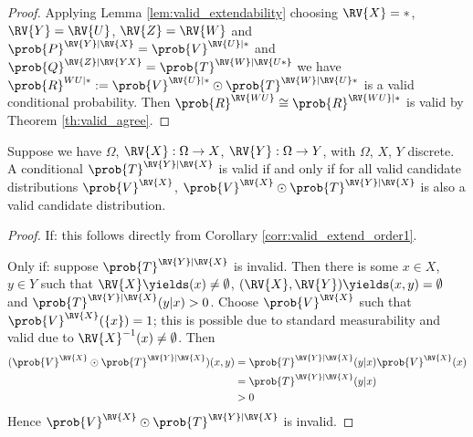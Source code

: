\begin{proof}
Applying Lemma \ref{lem:valid_extendability} choosing $\RV{X}=*$, $\RV{Y}=\RV{U}$, $\RV{Z}=\RV{W}$ and $\prob{P}^{\RV{Y}|\RV{X}}=\prob{V}^{\RV{U}|*}$ and $\prob{Q}^{\RV{Z}|\RV{YX}}=\prob{T}^{\RV{W}|\RV{U*}}$ we have $\prob{R}^{WU|*}:=\prob{V}^{\RV{U}|*}\odot \prob{T}^{\RV{W}|\RV{U}*}$ is a valid conditional probability. Then $\prob{R}^{\RV{WU}}\cong \prob{R}^{\RV{WU}|*}$ is valid by Theorem \ref{th:valid_agree}.
\end{proof}

\begin{theorem}\label{th:valid_conditional_probability}
Suppose we have $\Omega$, $\RV{X}:\Omega\to X$, $\RV{Y}:\Omega\to Y$, with $\Omega$, $X$, $Y$ discrete. A conditional $\prob{T}^{\RV{Y}|\RV{X}}$ is valid if and only if for all valid candidate distributions $\prob{V}^{\RV{X}}$, $\prob{V}^{\RV{X}}\odot \prob{T}^{\RV{Y}|\RV{X}}$ is also a valid candidate distribution.
\end{theorem}

\begin{proof}
If: this follows directly from Corollary \ref{corr:valid_extend_order1}.

Only if: suppose $\prob{T}^{\RV{Y}|\RV{X}}$ is invalid. Then there is some $x\in X$, $y\in Y$ such that $\RV{X}\yields(x)\neq \emptyset$, $(\RV{X},\RV{Y})\yields(x,y)=\emptyset$ and $\prob{T}^{\RV{Y}|\RV{X}}(y|x)>0$. Choose $\prob{V}^{\RV{X}}$ such that $\prob{V}^{\RV{X}}(\{x\})=1$; this is possible due to standard measurability and valid due to $\RV{X}^{-1}(x)\neq \emptyset$. Then
\begin{align}
    (\prob{V}^{\RV{X}}\odot \prob{T}^{\RV{Y}|\RV{X}})(x,y) &= \prob{T}^{\RV{Y}|\RV{X}}(y|x) \prob{V}^{\RV{X}}(x)\\
                                                                     &= \prob{T}^{\RV{Y}|\RV{X}}(y|x)\\
                                                                     &>0
\end{align}
Hence $\prob{V}^{\RV{X}}\odot \prob{T}^{\RV{Y}|\RV{X}}$ is invalid.
\end{proof}
